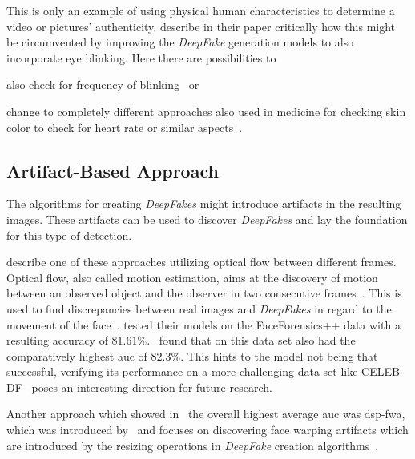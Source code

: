 \par
This is only an example of using physical human characteristics to determine a
video or pictures' authenticity. \textcite{li_ictu_2018} describe in 
their paper critically how this might be circumvented by improving the \textit{DeepFake}
generation models to also incorporate eye blinking. Here there are possibilities
to 
\begin{enumerate*}[a.)]
    \item also check for frequency of blinking~\cite{li_ictu_2018} or
    \item change to completely different approaches also used in medicine for
    checking skin color to check for heart rate or similar aspects~\cite{pishori_detecting_2020}.
\end{enumerate*}

\subsection{Artifact-Based Approach}
The algorithms for creating \textit{DeepFakes} might introduce artifacts in the resulting
images. These artifacts can be used to discover \textit{DeepFakes} and lay the foundation
for this type of detection.

\par
\textcite{amerini_deepfake_2019} describe one of these approaches utilizing optical
flow between different frames.
Optical flow, also called motion estimation, aims at the discovery of motion
between an observed object and the observer in two consecutive frames~\cite{beauchemin_computation_1995}.
This is used to find discrepancies between real images and \textit{DeepFakes} in regard
to the movement of the face~\cite{amerini_deepfake_2019}.
\textcite{amerini_deepfake_2019} tested their models on the FaceForensics++ data
with a resulting accuracy of \(81.61\%\).~\textcite{li_celeb-df_2019} found that
on this data set also had the comparatively highest \gls{auc} of \(82.3\%\).
This hints to the model not being that successful, verifying its performance on
a more challenging data set like CELEB-DF~\cite{li_celeb-df_2019} poses
an interesting direction for future research.

\par
Another approach which showed in~\cite{li_celeb-df_2019} the overall highest
average \gls{auc} was \gls{dsp-fwa}, which was introduced by~\cite{he_spatial_2014}
and focuses on discovering face warping artifacts which are introduced by the 
resizing operations in \textit{DeepFake} creation algorithms~\cite{li_celeb-df_2019,he_spatial_2014}.

